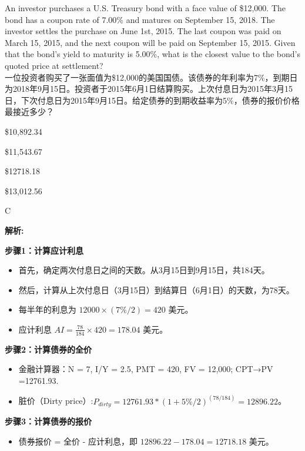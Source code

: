\documentclass{article}
\newcounter{question} %
\newenvironment{explanation}
{\textbf{解析:}\par}
{\par}
\begin{document}
\begin{question}
    An investor purchases a U.S. Treasury bond with a face value of \$12,000. The bond has a coupon rate of 7.00\% and matures on September 15, 2018. The investor settles the purchase on June 1st, 2015. The last coupon was paid on March 15, 2015, and the next coupon will be paid on September 15, 2015. Given that the bond's yield to maturity is 5.00\%, what is the closest value to the bond's quoted price at settlement?
    \\一位投资者购买了一张面值为\$12,000的美国国债。该债券的年利率为7\%，到期日为2018年9月15日。投资者于2015年6月1日结算购买。上次付息日为2015年3月15日，下次付息日为2015年9月15日。给定债券的到期收益率为5\%，债券的报价价格最接近多少？
    \end{question}
    
    \begin{choices}
        \item \$10,892.34
        \item \$11,543.67
        \item \$12718.18
        \item \$13,012.56
    \end{choices}
    
    \begin{correctanswer}
        C
    \end{correctanswer}
    
    \begin{explanation}
    \textbf{步骤1：计算应计利息}
    \begin{itemize}
    \item 首先，确定两次付息日之间的天数。从3月15日到9月15日，共184天。
    \item 然后，计算从上次付息日（3月15日）到结算日（6月1日）的天数，为78天。
    \item 每半年的利息为 $12000\times(7\%/2) = 420$ 美元。
    \item 应计利息 $AI=\frac{78}{184}\times420=178.04$ 美元。
    \end{itemize}
    \textbf{步骤2：计算债券的全价}
    \begin{itemize}
    \item 金融计算器：N = 7, I/Y = 2.5, PMT = 420, FV = 12,000; CPT→PV =12761.93.
    \item 脏价（Dirty price）:$P_{dirty}=12761.93*(1+5\%/2)^(78/184)=12896.22$。
    \end{itemize}
    \textbf{步骤3：计算债券的报价}
    \begin{itemize}
    \item 债券报价 = 全价 - 应计利息，即 $12896.22-178.04=12718.18$ 美元。
    \end{itemize}
    \end{explanation}
    
\end{document}
